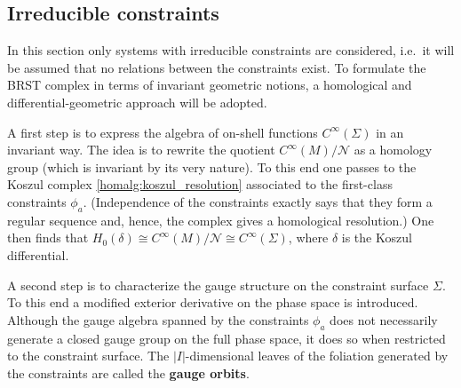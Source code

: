\subsection{Irreducible constraints}

    In this section only systems with irreducible constraints are considered, i.e.~it will be assumed that no relations between the constraints exist. To formulate the BRST complex in terms of invariant geometric notions, a homological and differential-geometric approach will be adopted.

    A first step is to express the algebra of on-shell functions $C^\infty(\Sigma)$ in an invariant way. The idea is to rewrite the quotient $C^\infty(M)/\mathcal{N}$ as a homology group (which is invariant by its very nature). To this end one passes to the Koszul complex \ref{homalg:koszul_resolution} associated to the first-class constraints $\phi_a$. (Independence of the constraints exactly says that they form a regular sequence and, hence, the complex gives a homological resolution.) One then finds that $H_0(\delta)\cong C^\infty(M)/\mathcal{N}\cong C^\infty(\Sigma)$, where $\delta$ is the Koszul differential.

    A second step is to characterize the gauge structure on the constraint surface $\Sigma$. To this end a modified exterior derivative on the phase space is introduced. Although the gauge algebra spanned by the constraints $\phi_a$ does not necessarily generate a closed gauge group on the full phase space, it does so when restricted to the constraint surface. The $|I|$-dimensional leaves of the foliation generated by the constraints are called the \textbf{gauge orbits}.

